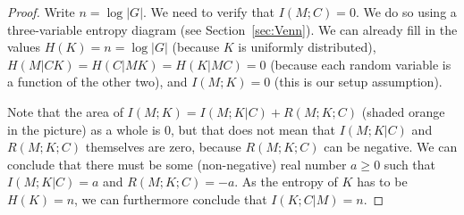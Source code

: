 \begin{proof}
Write $n = \log|G|$. We need to verify that $I(M;C) = 0$. We do so using a three-variable entropy diagram (see Section~\ref{sec:Venn}). We can already fill in the values $H(K) = n = \log|G|$ (because $K$ is uniformly distributed), $H(M|CK) = H(C|MK) = H(K|MC) = 0$ (because each random variable is a function of the other two), and $I(M;K) = 0$ (this is our setup assumption).

\begin{center}
\end{center}
Note that the area of $I(M;K) = I(M;K|C) + R(M;K;C)$ (shaded orange in the picture) as a whole is 0, but that does not mean that $I(M;K|C)$ and $R(M;K;C)$ themselves are zero, because $R(M;K;C)$ can be negative. We can conclude that there must be some (non-negative) real number $a \geq 0$ such that $I(M;K|C) = a$ and $R(M;K;C) = -a$. As the entropy of $K$ has to be $H(K)=n$, we can furthermore conclude that $I(K;C|M) = n$.


\end{proof}
